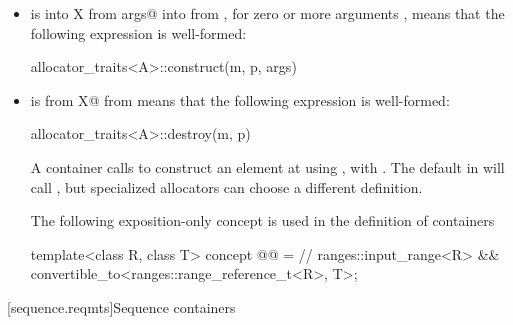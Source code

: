 \documentclass{wg21}
\begin{document}
\begin{itemize}
\item
{} is
{ into X from args@ into  from },
for zero
or more arguments , means that the following expression is well-formed:
\begin{codeblock}
    allocator_traits<A>::construct(m, p, args)
\end{codeblock}

\item
{} is
{ from X@ from }
means that the following expression is well-formed:
\begin{codeblock}
    allocator_traits<A>::destroy(m, p)
\end{codeblock}


\begin{note}
A container calls 
to construct an element at  using ,
with .
The default  in  will
call ,
but specialized allocators can choose a different definition.
\end{note}

\begin{addedblock}
    The following exposition-only concept is used in the definition of containers
\begin{codeblock}
template<class R, class T>
concept @@ = // \expos
       ranges::input_range<R> &&
       convertible_to<ranges::range_reference_t<R>, T>;
\end{codeblock}
\end{addedblock}

\end{itemize}


[sequence.reqmts]{Sequence containers}
\end{document}
